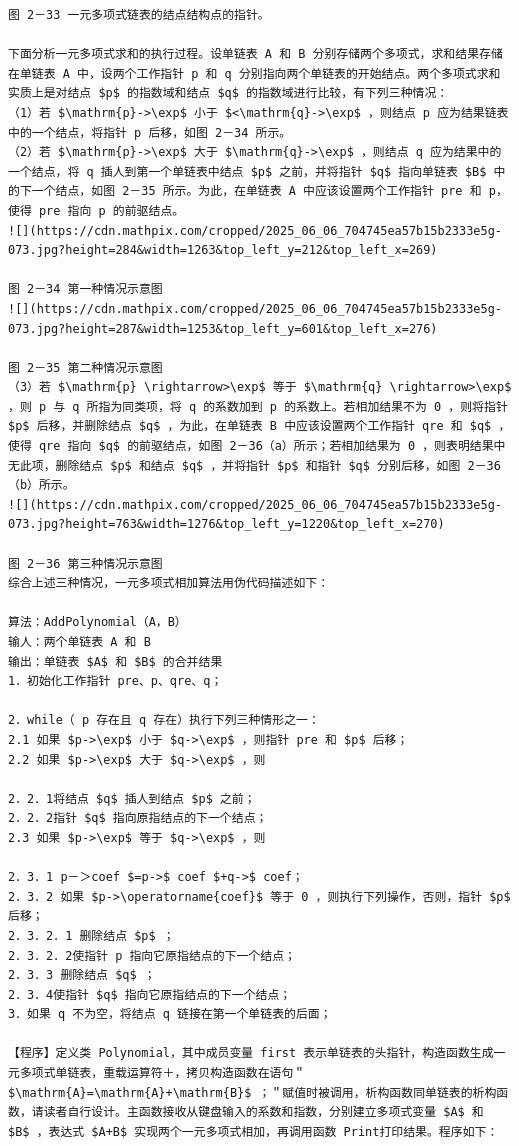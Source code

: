 \documentclass[10pt]{article}
\begin{document}
\begin{verbatim}
图 2－33 一元多项式链表的结点结构点的指针。

下面分析一元多项式求和的执行过程。设单链表 A 和 B 分别存储两个多项式，求和结果存储在单链表 A 中，设两个工作指针 p 和 q 分别指向两个单链表的开始结点。两个多项式求和实质上是对结点 $p$ 的指数域和结点 $q$ 的指数域进行比较，有下列三种情况：
（1）若 $\mathrm{p}->\exp$ 小于 $<\mathrm{q}->\exp$ ，则结点 p 应为结果链表中的一个结点，将指针 p 后移，如图 2－34 所示。
（2）若 $\mathrm{p}->\exp$ 大于 $\mathrm{q}->\exp$ ，则结点 q 应为结果中的一个结点，将 q 插人到第一个单链表中结点 $p$ 之前，并将指针 $q$ 指向单链表 $B$ 中的下一个结点，如图 2－35 所示。为此，在单链表 A 中应该设置两个工作指针 pre 和 p，使得 pre 指向 p 的前驱结点。
![](https://cdn.mathpix.com/cropped/2025_06_06_704745ea57b15b2333e5g-073.jpg?height=284&width=1263&top_left_y=212&top_left_x=269)

图 2－34 第一种情况示意图
![](https://cdn.mathpix.com/cropped/2025_06_06_704745ea57b15b2333e5g-073.jpg?height=287&width=1253&top_left_y=601&top_left_x=276)

图 2－35 第二种情况示意图
（3）若 $\mathrm{p} \rightarrow>\exp$ 等于 $\mathrm{q} \rightarrow>\exp$ ，则 p 与 q 所指为同类项，将 q 的系数加到 p 的系数上。若相加结果不为 0 ，则将指针 $p$ 后移，并删除结点 $q$ ，为此，在单链表 B 中应该设置两个工作指针 qre 和 $q$ ，使得 qre 指向 $q$ 的前驱结点，如图 2－36（a）所示；若相加结果为 0 ，则表明结果中无此项，删除结点 $p$ 和结点 $q$ ，并将指针 $p$ 和指针 $q$ 分别后移，如图 2－36（b）所示。
![](https://cdn.mathpix.com/cropped/2025_06_06_704745ea57b15b2333e5g-073.jpg?height=763&width=1276&top_left_y=1220&top_left_x=270)

图 2－36 第三种情况示意图
综合上述三种情况，一元多项式相加算法用伪代码描述如下：

算法：AddPolynomial（A，B）
输人：两个单链表 A 和 B
输出：单链表 $A$ 和 $B$ 的合并结果
1．初始化工作指针 pre、p、qre、q；

2．while（ p 存在且 q 存在）执行下列三种情形之一：
2.1 如果 $p->\exp$ 小于 $q->\exp$ ，则指针 pre 和 $p$ 后移；
2.2 如果 $p->\exp$ 大于 $q->\exp$ ，则

2．2．1将结点 $q$ 插人到结点 $p$ 之前；
2．2．2指针 $q$ 指向原指结点的下一个结点；
2.3 如果 $p->\exp$ 等于 $q->\exp$ ，则

2．3．1 p－＞coef $=p->$ coef $+q->$ coef；
2．3．2 如果 $p->\operatorname{coef}$ 等于 0 ，则执行下列操作，否则，指针 $p$ 后移；
2．3．2．1 删除结点 $p$ ；
2．3．2．2使指针 p 指向它原指结点的下一个结点；
2．3．3 删除结点 $q$ ；
2．3．4使指针 $q$ 指向它原指结点的下一个结点；
3．如果 q 不为空，将结点 q 链接在第一个单链表的后面；

【程序】定义类 Polynomial，其中成员变量 first 表示单链表的头指针，构造函数生成一元多项式单链表，重载运算符＋，拷贝构造函数在语句＂ $\mathrm{A}=\mathrm{A}+\mathrm{B}$ ；＂赋值时被调用，析构函数同单链表的析构函数，请读者自行设计。主函数接收从键盘输入的系数和指数，分别建立多项式变量 $A$ 和 $B$ ，表达式 $A+B$ 实现两个一元多项式相加，再调用函数 Print打印结果。程序如下：
\end{verbatim}
\end{document}
